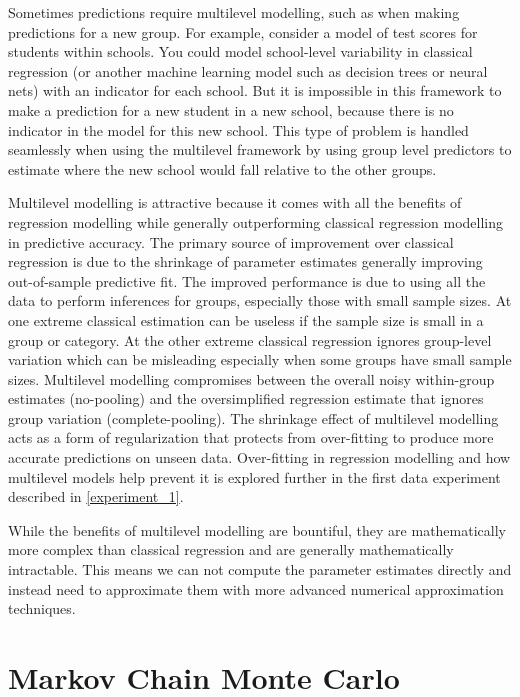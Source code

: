 Sometimes predictions require multilevel modelling, such as when making predictions for a new group. For example, consider a model of test scores for students within schools. You could model school-level variability in classical regression (or another machine learning model such as decision trees or neural nets) with an indicator for each school. But it is impossible in this framework to make a prediction for a new student in a new school, because there is no indicator in the model for this new school. This type of problem is handled seamlessly when using the multilevel framework by using group level predictors to estimate where the new school would fall relative to the other groups.

Multilevel modelling is attractive because it comes with all the benefits of regression modelling while generally outperforming classical regression modelling in predictive accuracy. The primary source of improvement over classical regression is due to the shrinkage of parameter estimates generally improving out-of-sample predictive fit. The improved performance is due to using all the data to perform inferences for groups, especially those with small sample sizes. At one extreme classical estimation can be useless if the sample size is small in a group or category. At the other extreme classical regression ignores group-level variation which can be misleading especially when some groups have small sample sizes. Multilevel modelling compromises between the overall noisy within-group estimates (no-pooling) and the oversimplified regression estimate that ignores group variation (complete-pooling). The shrinkage effect of multilevel modelling acts as a form of regularization that protects from over-fitting to produce more accurate predictions on unseen data. Over-fitting in regression modelling and how multilevel models help prevent it is explored further in the first data experiment described in \ref{experiment_1}.

While the benefits of multilevel modelling are bountiful, they are mathematically more complex than classical regression and are generally mathematically intractable. This means we can not compute the parameter estimates directly and instead need to approximate them with more advanced numerical approximation techniques.

\section{Markov Chain Monte Carlo}

